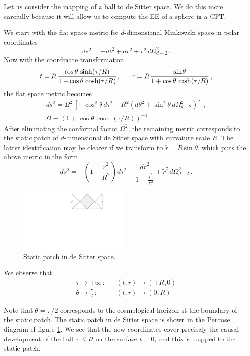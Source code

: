 \documentclass[11pt]{article}
\numberwithin{equation}{section}
\newcommand\eea{\end{eqnarray}}
\newcommand\bea{\begin{eqnarray}}
\def\beq{\begin{equation}}
\def\eeq{\end{equation}}
\newcommand{\be}{\begin{equation}}
\newcommand{\ee}{\end{equation}}
\begin{document}
Let us consider the mapping of a ball to de Sitter space. We do this more carefully because it will allow us to compute the EE of a sphere in a CFT. 
 
 We start
 with the flat space metric for $d$-dimensional Minkowski space in
polar coordinates
%
 \beq
ds^2=-dt^2+dr^2+r^2\,d\Omega^2_{d-2}\,.
 \label{flat1}
 \eeq
%
Now with the coordinate transformation
%
 \be
t=R\,\frac{\cos\theta\,\sinh(\tau/R)}{1+\cos\theta\,\cosh(\tau/R)}\,,\hspace{.6cm}
 \label{trn2}
%
r=R\,\frac{\sin\theta}{1+\cos\theta\,\cosh(\tau/R)}\,,
 \ee
%
 the flat space metric  becomes
%
 \begin{multline}
ds^2=\Omega^2\, \left[-\cos^2\!\theta\, d\tau^2+
R^2\left(d\theta^2+\sin^2\!\theta\,d\Omega^2_{d-2}\right)\right]\,,\\
 \label{round0}
%
\Omega=(1+\cos\theta\,\cosh(\tau/R))^{-1}\,.
\end{multline}
%
After eliminating the conformal factor $\Omega^2$, the remaining metric
corresponds to the static patch of $d$-dimensional de Sitter space with
curvature scale $R$. The latter identification may be clearer if we
transform to $\tilde{r}= R\sin\theta$, which puts the above metric in the
form
%
 \beq
ds^2=-\left(
1-\frac{\tilde{r}^2}{R^2}\right)\,d\tau^2+\frac{d \tilde{r}^2}{1-\frac{\tilde{r}^2}{R^2}}
+\tilde{r}^2\,d\Omega^2_{d-2}\,.
 \label{twor}
 \eeq
%
\begin{figure}[t]
\begin{center}  
\includegraphics[width=0.5\textwidth]{desitter.pdf}
\captionsetup{width=0.9\textwidth}
\caption{Static patch in de Sitter space. }
\label{ds}
\end{center}  
\end{figure}

We observe that
%
 \bea
\tau\rightarrow\pm\infty\,:&&(t,r)\rightarrow(\pm R,0)\label{junker9}\\
\theta\rightarrow\frac{\pi}{2}\,:&&(t,r)\rightarrow(0,R)\nonumber
 \eea
%

Note that $\theta=\pi/2$ corresponds to the cosmological horizon at the
boundary of the static patch. The static patch in de Sitter space is shown in the Penrose diagram of figure \ref{ds}. We
see that the new coordinates cover precisely the causal development of the ball $r\le R$ on the surface $t=0$, and this is mapped to the static patch. 
\end{document}
